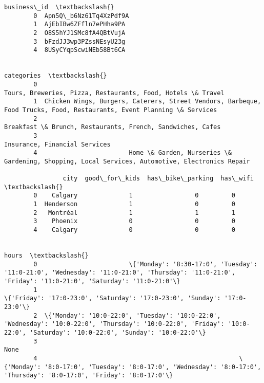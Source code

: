 \documentclass[11pt]{article}
\begin{document}
\begin{Verbatim}[commandchars=\\\{\}]
                      business\_id  \textbackslash{}
        0  Apn5Q\_b6Nz61Tq4XzPdf9A   
        1  AjEbIBw6ZFfln7ePHha9PA   
        2  O8S5hYJ1SMc8fA4QBtVujA   
        3  bFzdJJ3wp3PZssNEsyU23g   
        4  8USyCYqpScwiNEb58Bt6CA   
        
                                                                                                                      categories  \textbackslash{}
        0                                                            Tours, Breweries, Pizza, Restaurants, Food, Hotels \& Travel   
        1  Chicken Wings, Burgers, Caterers, Street Vendors, Barbeque, Food Trucks, Food, Restaurants, Event Planning \& Services   
        2                                                             Breakfast \& Brunch, Restaurants, French, Sandwiches, Cafes   
        3                                                                                          Insurance, Financial Services   
        4                         Home \& Garden, Nurseries \& Gardening, Shopping, Local Services, Automotive, Electronics Repair   
        
                city  good\_for\_kids  has\_bike\_parking  has\_wifi  \textbackslash{}
        0    Calgary              1                 0         0   
        1  Henderson              1                 0         0   
        2   Montréal              1                 1         1   
        3    Phoenix              0                 0         0   
        4    Calgary              0                 0         0   
        
                                                                                                                                                                               hours  \textbackslash{}
        0                         \{'Monday': '8:30-17:0', 'Tuesday': '11:0-21:0', 'Wednesday': '11:0-21:0', 'Thursday': '11:0-21:0', 'Friday': '11:0-21:0', 'Saturday': '11:0-21:0'\}   
        1                                                                                                    \{'Friday': '17:0-23:0', 'Saturday': '17:0-23:0', 'Sunday': '17:0-23:0'\}   
        2  \{'Monday': '10:0-22:0', 'Tuesday': '10:0-22:0', 'Wednesday': '10:0-22:0', 'Thursday': '10:0-22:0', 'Friday': '10:0-22:0', 'Saturday': '10:0-22:0', 'Sunday': '10:0-22:0'\}   
        3                                                                                                                                                                       None   
        4                                                       \{'Monday': '8:0-17:0', 'Tuesday': '8:0-17:0', 'Wednesday': '8:0-17:0', 'Thursday': '8:0-17:0', 'Friday': '8:0-17:0'\}   
        

\end{Verbatim}
\end{document}
